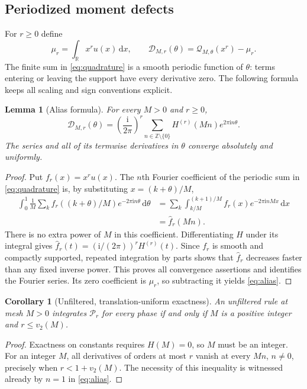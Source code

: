 \documentclass[11pt,a4paper]{article}
\numberwithin{equation}{section}
\newtheorem{lemma}[theorem]{Lemma}
\newtheorem{corollary}[theorem]{Corollary}
\theoremstyle{definition}
\theoremstyle{remark}
\newcommand{\R}{\mathbb R}\newcommand{\Z}{\mathbb Z}\newcommand{\N}{\mathbb N}
\newcommand{\dd}{\,\mathrm d}\newcommand{\ii}{\mathrm i}
\newcommand{\Pol}{\mathcal P}\newcommand{\norm}[1]{\left\lVert#1\right\rVert}
\newcommand{\Q}{\mathcal Q}\newcommand{\Def}{\mathcal D}
\begin{document}
\subsection{Periodized moment defects}

For $r\ge0$ define
\begin{equation}
 \mu_r=\int_\R x^ru(x)\dd x,
 \qquad
 \Def_{M,r}(\theta)=\Q_{M,\theta}(x^r)-\mu_r.
 \label{eq:defect}
\end{equation}
The finite sum in \eqref{eq:quadrature} is a smooth periodic function of
$\theta$: terms entering or leaving the support have every derivative zero.
The following formula keeps all scaling and sign conventions explicit.

\begin{lemma}[Alias formula]
\label{lem:alias}
For every $M>0$ and $r\ge0$,
\begin{equation}
 \Def_{M,r}(\theta)
 =\left(\frac{\ii}{2\pi}\right)^r
  \sum_{n\in\Z\setminus\{0\}}H^{(r)}(Mn)e^{2\pi\ii n\theta}.
 \label{eq:alias}
\end{equation}
The series and all of its termwise derivatives in $\theta$ converge
absolutely and uniformly.
\end{lemma}

\begin{proof}
Put $f_r(x)=x^ru(x)$. The $n$th Fourier coefficient of the periodic
sum in \eqref{eq:quadrature} is, by substituting $x=(k+\theta)/M$,
\begin{align*}
 \int_0^1\frac1M\sum_k f_r((k+\theta)/M)e^{-2\pi\ii n\theta}\dd\theta
 &=\sum_k\int_{k/M}^{(k+1)/M}f_r(x)e^{-2\pi\ii nMx}\dd x\\
 &=\widehat f_r(Mn).
\end{align*}
There is no extra power of $M$ in this coefficient. Differentiating
$H$ under its integral gives
$\widehat f_r(t)=(\ii/(2\pi))^rH^{(r)}(t)$.
Since $f_r$ is smooth and compactly supported, repeated integration by
parts shows that $\widehat f_r$ decreases faster than any fixed inverse
power. This proves all convergence assertions and identifies the Fourier
series. Its zero coefficient is $\mu_r$, so subtracting it yields
\eqref{eq:alias}.
\end{proof}

\begin{corollary}[Unfiltered, translation-uniform exactness]
\label{cor:unfiltered}
An unfiltered rule at mesh $M>0$ integrates $\Pol_r$ for every phase if and
only if $M$ is a positive integer and $r\le v_2(M)$.
\end{corollary}
\begin{proof}
Exactness on constants requires $H(M)=0$, so $M$ must be an integer.
For an integer $M$, all derivatives of orders at most $r$ vanish at every
$Mn$, $n\ne0$, precisely when $r<1+v_2(M)$. The necessity of this
inequality is witnessed already by $n=1$ in \eqref{eq:alias}.
\end{proof}
\end{document}
